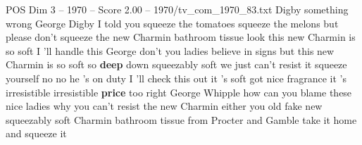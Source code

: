 \begin{textsample}{POS Dim 3 – 1970 – Score 2.00 – 1970/tv\_com\_1970\_83.txt}  \label{ex:f3_pos_038}
Digby something wrong George Digby I told you squeeze the tomatoes squeeze the melons but please don't squeeze the new Charmin bathroom tissue look this new Charmin is so soft I 'll handle this George don't you ladies believe in signs but this new Charmin is so soft so \textbf{deep} down squeezably soft we just can't resist it squeeze yourself no no he 's on duty I 'll check this out it 's soft got nice fragrance it 's irresistible irresistible \textbf{price} too right George Whipple how can you blame these nice ladies why you can't resist the new Charmin either you old fake new squeezably soft Charmin bathroom tissue from Procter and Gamble take it home and squeeze it

\end{textsample}
